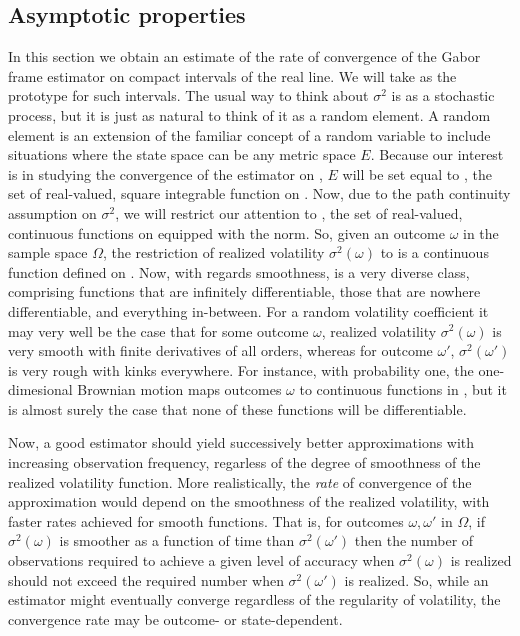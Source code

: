 \subsection{Asymptotic properties} \label{sec:deviation}
In this section we obtain an estimate of the rate of convergence of  the Gabor frame estimator on compact intervals of the real line. We will take \domain as the prototype for such intervals. The usual way to think about  $\sigma^2$ is as a stochastic process, but it is just as natural to think of it as a random element. A random element is an extension  of the familiar concept of a random variable to include  situations where the state space can be any metric space $E$. Because our interest is in studying the convergence of the estimator on \domain,  $E$ will be set equal to \Ltwo, the set of real-valued, square integrable function on \domain. Now, due to the path continuity assumption on $\sigma^2$, we will restrict our attention to \czero,  the set of real-valued, continuous  functions on \domain equipped with the \Ltwo norm. So, given  an outcome $\omega$ in the sample space  $\Omega$, the restriction of realized volatility $\sigma^2(\omega)$ to \domain is a  continuous function defined on \domain. Now, with regards smoothness, \state  is  a very diverse class, comprising    functions that are infinitely differentiable,  those that are nowhere differentiable, and everything in-between. For a random volatility coefficient it may very well be the case that for some outcome $\omega$, realized volatility $\sigma^2(\omega)$ is very smooth with finite derivatives of all orders, whereas for outcome $\omega'$,  $\sigma^2(\omega')$  is very rough with kinks everywhere. For instance, with probability one, the one-dimesional Brownian motion  maps outcomes $\omega$  to continuous functions in  \state, but it is  almost surely  the case that none of these functions will be  differentiable. 

Now,  a good estimator should  yield successively better approximations with increasing observation frequency, regarless of the degree of smoothness  of the realized volatility function. More realistically, the \emph{rate} of convergence of the approximation would depend on the smoothness of the realized volatility, with faster rates achieved for smooth functions. That is, for outcomes $\omega, \omega'$ in $\Omega$, if $\sigma^2(\omega)$ is  smoother as a function of time than $\sigma^2(\omega')$ then the number of observations required to achieve a given level of accuracy when $\sigma^2(\omega)$ is realized should not exceed  the required number when $\sigma^2(\omega')$ is realized.  So, while an estimator might eventually converge regardless of the regularity of volatility, the convergence rate may be outcome- or state-dependent. 

